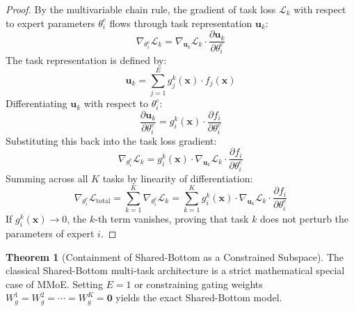 \documentclass[11pt,a4paper]{article}
\theoremstyle{definition}
\newtheorem{theorem}{\textbf{Theorem}}[section]
\begin{document}
\begin{proof}
By the multivariable chain rule, the gradient of task loss $\mathcal{L}_k$ with respect to expert parameters $\theta_i^e$ flows through task representation $\mathbf{u}_k$:
{\boldmath
\begin{equation}
\nabla_{\theta_i^e} \mathcal{L}_k = \nabla_{\mathbf{u}_k} \mathcal{L}_k \cdot \frac{\partial \mathbf{u}_k}{\partial \theta_i^e}
\end{equation}
}
The task representation is defined by:
{\boldmath
\begin{equation}
\mathbf{u}_k = \sum_{j=1}^E g_j^k(\mathbf{x}) \cdot f_j(\mathbf{x})
\end{equation}
}
Differentiating $\mathbf{u}_k$ with respect to $\theta_i^e$:
{\boldmath
\begin{equation}
\frac{\partial \mathbf{u}_k}{\partial \theta_i^e} = g_i^k(\mathbf{x}) \cdot \frac{\partial f_i}{\partial \theta_i^e}
\end{equation}
}
Substituting this back into the task loss gradient:
{\boldmath
\begin{equation}
\nabla_{\theta_i^e} \mathcal{L}_k = g_i^k(\mathbf{x}) \cdot \nabla_{\mathbf{u}_k} \mathcal{L}_k \cdot \frac{\partial f_i}{\partial \theta_i^e}
\end{equation}
}
Summing across all $K$ tasks by linearity of differentiation:
{\boldmath
\begin{equation}
\nabla_{\theta_i^e} \mathcal{L}_{\text{total}} = \sum_{k=1}^K \nabla_{\theta_i^e} \mathcal{L}_k = \sum_{k=1}^K g_i^k(\mathbf{x}) \cdot \nabla_{\mathbf{u}_k} \mathcal{L}_k \cdot \frac{\partial f_i}{\partial \theta_i^e}
\end{equation}
}
If $g_i^k(\mathbf{x}) \to 0$, the $k$-th term vanishes, proving that task $k$ does not perturb the parameters of expert $i$.
\end{proof}

\begin{theorem}[Containment of Shared-Bottom as a Constrained Subspace]
The classical Shared-Bottom multi-task architecture is a strict mathematical special case of MMoE. Setting $E=1$ or constraining gating weights $W_g^1 = W_g^2 = \cdots = W_g^K = \mathbf{0}$ yields the exact Shared-Bottom model.
\end{theorem}
\end{document}
